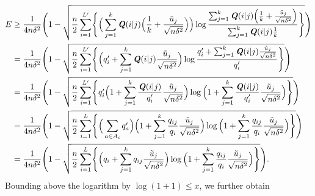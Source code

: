 \documentclass[11pt,onecolumn]{IEEEtran}
\def\mathbi#1{{\textbf{\textit #1}}}
\begin{document}
    \begin{align*}
E&\ge \frac{1}{4 n\delta^2} \Biggl(1 - 
\sqrt{\frac{n}{2} \sum_{i=1}^{L'} \Biggl\{\Big(
\sum_{j=1}^k \mathbi{Q}(i|j) \Big(\frac{1}{k}+\frac{\tilde{u}_j}{\sqrt{n\delta^2}} \Big)  \Big)
\log \frac{\sum_{j=1}^k \mathbi{Q}(i|j) \Big(\frac{1}{k}+\frac{\tilde{u}_j}{\sqrt{n\delta^2}} \Big)}
{\sum_{j=1}^k \mathbi{Q}(i|j) \frac{1}{k} }  \Biggr\}  } \Biggr) \\
&= \frac{1}{4 n\delta^2} \Biggl(1 - 
\sqrt{\frac{n}{2} \sum_{i=1}^{L'} \Biggl\{
\Big(q_i'+\sum_{j=1}^k \mathbi{Q}(i|j) \frac{\tilde{u}_j}{\sqrt{n\delta^2}} \Big) 
\log \frac{q_i'+\sum_{j=1}^k \mathbi{Q}(i|j) \frac{\tilde{u}_j}{\sqrt{n\delta^2}}  }
{q_i' }  \Biggr\}  } \Biggr) \\
&= \frac{1}{4 n\delta^2} \Biggl(1 - 
\sqrt{\frac{n}{2} \sum_{i=1}^{L'} \Biggl\{ q_i'
\Big(1 + \sum_{j=1}^k \frac{\mathbi{Q}(i|j)}{q_i'} \frac{\tilde{u}_j}{\sqrt{n\delta^2}} \Big) 
\log \Big( 1+\sum_{j=1}^k \frac{\mathbi{Q}(i|j)}{q_i'} \frac{\tilde{u}_j}{\sqrt{n\delta^2}}  \Big)  \Biggr\}  } \Biggr) \\
&= \frac{1}{4 n\delta^2} \Biggl(1 - 
\sqrt{\frac{n}{2} \sum_{i=1}^{L} \Biggl\{ \Big(\sum_{a\in A_i} q_a' \Big)
\Big(1 + \sum_{j=1}^k \frac{q_{ij}}{q_i} \frac{\tilde{u}_j}{\sqrt{n\delta^2}} \Big) 
\log \Big( 1+\sum_{j=1}^k \frac{q_{ij}}{q_i} \frac{\tilde{u}_j}{\sqrt{n\delta^2}}    \Big) \Biggr\} } \Biggr) \\
&= \frac{1}{4 n\delta^2} \Biggl(1 - 
\sqrt{\frac{n}{2} \sum_{i=1}^{L}  \Biggl\{
\Big(q_i + \sum_{j=1}^k q_{ij} \frac{\tilde{u}_j}{\sqrt{n\delta^2}} \Big) 
\log \Big( 1+\sum_{j=1}^k \frac{q_{ij}}{q_i} \frac{\tilde{u}_j}{\sqrt{n\delta^2}}  \Big)  \Biggr\}  } \Biggr) .
\end{align*}
Bounding above the logarithm by $\log(1+1)\le x$, we further obtain
\end{document}
